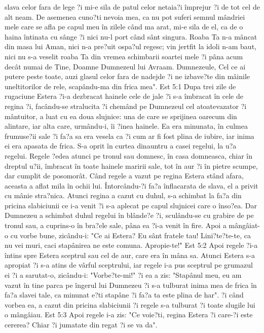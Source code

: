 slava celor fara de lege ?i mi-e sila de patul celor netaia?i împrejur ?i de tot cel de alt neam. De asemenea cuno?ti nevoia mea, ca nu pot suferi semnul mândriei mele care se afla pe capul meu în zilele când ma arat, mi-e sila de el, ca de o haina întinata cu sânge ?i nici nu-l port când sânt singura. Roaba Ta n-a mâncat din masa lui Aman, nici n-a pre?uit ospa?ul regesc; vin jertfit la idoli n-am baut, nici nu s-a veselit roaba Ta din vremea schimbarii soartei mele ?i pâna acum decât numai de Tine, Doamne Dumnezeul lui Avraam. Dumnezeule, Cel ce ai putere peste toate, auzi glasul celor fara de nadejde ?i ne izbave?te din mâinile uneltitorilor de rele, scapându-ma din frica mea".
Est 5:1  Dupa trei zile de rugaciune Estera ?i-a dezbracat hainele cele de jale ?i s-a îmbracat în cele de regina ?i, facându-se stralucita ?i chemând pe Dumnezeul cel atoatevazator ?i mântuitor, a luat cu ea doua slujnice: una de care se sprijinea oarecum din alintare, iar alta care, urmându-i, îi ?inea hainele. Ea era minunata, în culmea frumuse?ii sale ?i fa?a sa era vesela ca ?i cum ar fi fost plina de iubire, iar inima ei era apasata de frica. S-a oprit în curtea dinauntru a casei regelui, la u?a regelui. Regele ?edea atunci pe tronul sau domnesc, în casa domneasca, chiar în dreptul u?ii, îmbracat în toate hainele maririi sale, tot în aur ?i în pietre scumpe, dar cumplit de posomorât. Când regele a vazut pe regina Estera stând afara, aceasta a aflat mila în ochii lui. Întorcându-?i fa?a înflacarata de slava, el a privit cu mânie stra?nica. Atunci regina a cazut cu duhul, s-a schimbat la fa?a din pricina slabiciunii ce i-a venit ?i s-a aplecat pe capul slujnicei care o înso?ea. Dar Dumnezeu a schimbat duhul regelui în blânde?e ?i, sculându-se cu grabire de pe tronul sau, a cuprins-o în bra?ele sale, pâna ea ?i-a venit în fire. Apoi a mângâiat-o cu vorbe bune, zicându-i: "Ce ai Estera? Eu sânt fratele tau! Lini?te?te-te, ca nu vei muri, caci stapânirea ne este comuna. Apropie-te!"
Est 5:2  Apoi regele ?i-a întins spre Estera sceptrul sau cel de aur, care era în mâna sa. Atunci Estera s-a apropiat ?i s-a atins de vârful sceptrului, iar regele i-a pus sceptrul pe grumazul ei ?i a sarutat-o, zicându-i: "Vorbe?te-mi!" ?i ea a zis: "Stapânul meu, eu am vazut în tine parca pe îngerul lui Dumnezeu ?i s-a tulburat inima mea de frica în fa?a slavei tale, ca minunat e?ti stapâne ?i fa?a ta este plina de har". ?i când vorbea ea, a cazut din pricina slabiciunii ?i regele s-a tulburat ?i toate slugile lui o mângâiau.
Est 5:3  Apoi regele i-a zis: "Ce voie?ti, regina Estera ?i care-?i este cererea? Chiar ?i jumatate din regat ?i se va da".
